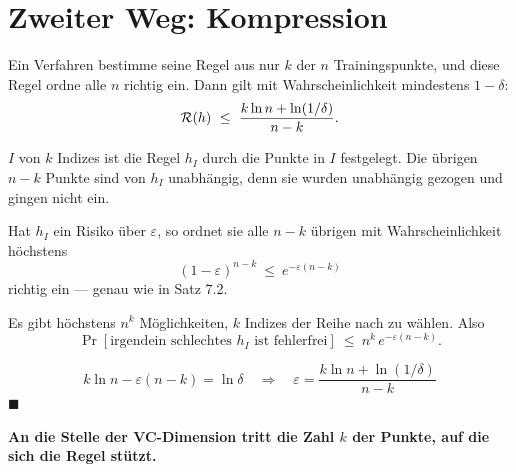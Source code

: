 \section{Zweiter Weg: Kompression}

\begin{merksatz}
Ein Verfahren bestimme seine Regel aus nur $k$ der $n$ Trainingspunkte, und diese Regel ordne alle $n$ richtig ein. Dann gilt mit Wahrscheinlichkeit mindestens $1-\delta$:
\[ \mathcal{R}(h) \ \le\ \frac{k\ln n + \ln(1/\delta)}{n-k} . \]

 $I$ von $k$ Indizes ist die Regel $h_I$ durch die Punkte in $I$ festgelegt. Die übrigen $n-k$ Punkte sind von $h_I$ unabhängig, denn sie wurden unabhängig gezogen und gingen nicht ein.

Hat $h_I$ ein Risiko über $\varepsilon$, so ordnet sie alle $n-k$ übrigen mit Wahrscheinlichkeit höchstens
\[ (1-\varepsilon)^{n-k} \ \le\ e^{-\varepsilon(n-k)} \]
richtig ein --- genau wie in Satz 7.2.

 Es gibt höchstens $n^{k}$ Möglichkeiten, $k$ Indizes der Reihe nach zu wählen. Also
\[ \Pr[\text{irgendein schlechtes } h_I \text{ ist fehlerfrei}] \ \le\ n^{k}\,e^{-\varepsilon(n-k)} . \]

\[ k\ln n - \varepsilon(n-k) = \ln\delta \quad\Longrightarrow\quad \varepsilon = \frac{k\ln n + \ln(1/\delta)}{n-k} \]
$\blacksquare$

\begin{center}
\begin{minipage}{0.9\textwidth}
\textbf{An die Stelle der VC-Dimension tritt die Zahl $k$ der Punkte, auf die sich die Regel stützt.}
\end{minipage}
\end{center}

\begin{center}
\begin{minipage}{0.88\textwidth}
\end{minipage}
\end{center}
\end{merksatz}

